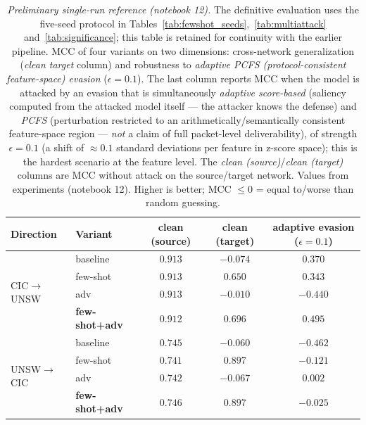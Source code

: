 \documentclass[preprint,12pt,authoryear]{elsarticle}
\begin{document}
\begin{table}[h]
\centering
\caption{\emph{Preliminary single-run reference (notebook 12).} The definitive evaluation uses the five-seed protocol in Tables~\ref{tab:fewshot_seeds},~\ref{tab:multiattack} and~\ref{tab:significance}; this table is retained for continuity with the earlier pipeline. MCC of four variants on two dimensions: cross-network generalization
(\emph{clean target} column) and robustness to \emph{adaptive PCFS
(protocol-consistent feature-space) evasion} ($\epsilon=0.1$). The last column
reports MCC when the model is attacked by an evasion that is simultaneously
\emph{adaptive score-based} (saliency computed from the attacked model itself --- the
attacker knows the defense) and \emph{PCFS} (perturbation restricted to an
arithmetically/semantically consistent feature-space region --- \emph{not} a claim
of full packet-level deliverability), of strength $\epsilon=0.1$ (a shift of
$\approx 0.1$ standard deviations per feature in z-score space); this is the hardest
scenario at the feature level. The \emph{clean (source)}/\emph{clean (target)}
columns are MCC without attack on the source/target network. Values from
experiments (notebook 12). Higher is better; MCC $\le 0$ = equal to/worse than
random guessing.}
\label{tab:p2main}
\small
\begin{tabular}{llccc}
\toprule
Direction & Variant & clean (source) & clean (target) & adaptive evasion ($\epsilon=0.1$) \\
\midrule
\multirow{4}{*}{CIC$\rightarrow$UNSW}
 & baseline     & $0.913$ & $-0.074$ & $0.370$ \\
 & few-shot     & $0.913$ & $0.650$ & $0.343$ \\
 & adv          & $0.913$ & $-0.010$ & $-0.440$ \\
 & \textbf{few-shot+adv} & $0.912$ & $\mathbf{0.696}$ & $\mathbf{0.495}$ \\
\midrule
\multirow{4}{*}{UNSW$\rightarrow$CIC}
 & baseline     & $0.745$ & $-0.060$ & $-0.462$ \\
 & few-shot     & $0.741$ & $0.897$ & $-0.121$ \\
 & adv          & $0.742$ & $-0.067$ & $0.002$ \\
 & \textbf{few-shot+adv} & $0.746$ & $\mathbf{0.897}$ & $-0.025$ \\
\bottomrule
\end{tabular}
\end{table}
\end{document}

